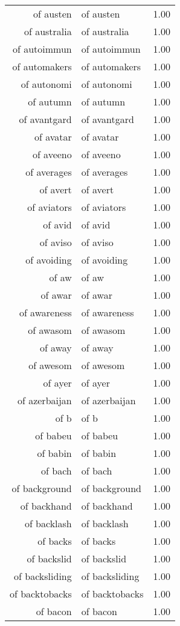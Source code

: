 \begin{table}[ht]
\begin{tabular}{rlr}
  of austen & of austen & 1.00 \\ 
  of australia & of australia & 1.00 \\ 
  of autoimmun & of autoimmun & 1.00 \\ 
  of automakers & of automakers & 1.00 \\ 
  of autonomi & of autonomi & 1.00 \\ 
  of autumn & of autumn & 1.00 \\ 
  of avantgard & of avantgard & 1.00 \\ 
  of avatar & of avatar & 1.00 \\ 
  of aveeno & of aveeno & 1.00 \\ 
  of averages & of averages & 1.00 \\ 
  of avert & of avert & 1.00 \\ 
  of aviators & of aviators & 1.00 \\ 
  of avid & of avid & 1.00 \\ 
  of aviso & of aviso & 1.00 \\ 
  of avoiding & of avoiding & 1.00 \\ 
  of aw & of aw & 1.00 \\ 
  of awar & of awar & 1.00 \\ 
  of awareness & of awareness & 1.00 \\ 
  of awasom & of awasom & 1.00 \\ 
  of away & of away & 1.00 \\ 
  of awesom & of awesom & 1.00 \\ 
  of ayer & of ayer & 1.00 \\ 
  of azerbaijan & of azerbaijan & 1.00 \\ 
  of b & of b & 1.00 \\ 
  of babeu & of babeu & 1.00 \\ 
  of babin & of babin & 1.00 \\ 
  of bach & of bach & 1.00 \\ 
  of background & of background & 1.00 \\ 
  of backhand & of backhand & 1.00 \\ 
  of backlash & of backlash & 1.00 \\ 
  of backs & of backs & 1.00 \\ 
  of backslid & of backslid & 1.00 \\ 
  of backsliding & of backsliding & 1.00 \\ 
  of backtobacks & of backtobacks & 1.00 \\ 
  of bacon & of bacon & 1.00 \\ 

\end{tabular}
\end{table}
